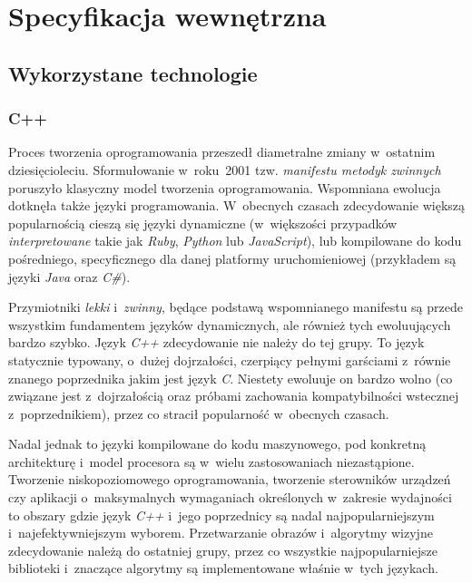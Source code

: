 \chapter{Specyfikacja wewnętrzna}\label{Chapter_SpecyfikacjaWewnetrzna}

  \section{Wykorzystane technologie}\label{Section_Technologie}

    \subsection{C++}\label{Subsection_Cpp}
      Proces tworzenia oprogramowania przeszedł diametralne zmiany w~ostatnim dziesięcioleciu. Sformułowanie w~roku~2001 tzw. \textit{manifestu metodyk zwinnych} poruszyło klasyczny model tworzenia oprogramowania. Wspomniana ewolucja dotknęła także języki programowania. W~obecnych czasach zdecydowanie większą popularnością cieszą się języki dynamiczne (w~większości przypadków \textit{interpretowane} takie jak \textit{Ruby}, \textit{Python} lub \textit{JavaScript}), lub kompilowane do kodu pośredniego, specyficznego dla danej platformy uruchomieniowej (przykładem są języki \textit{Java} oraz \textit{C\#}).

      Przymiotniki \textit{lekki} i~\textit{zwinny}, będące podstawą wspomnianego manifestu są przede wszystkim fundamentem języków dynamicznych, ale również tych ewoluujących bardzo szybko. Język \textit{C++} zdecydowanie nie należy do tej grupy. To język statycznie typowany, o~dużej dojrzałości, czerpiący pełnymi garściami z~równie znanego poprzednika jakim jest język \textit{C}. Niestety ewoluuje on bardzo wolno (co związane jest z~dojrzałością oraz próbami zachowania kompatybilności wstecznej z~poprzednikiem), przez co stracił popularność w~obecnych czasach.

      Nadal jednak to języki kompilowane do kodu maszynowego, pod konkretną architekturę i~model procesora są w~wielu zastosowaniach niezastąpione. Tworzenie niskopoziomowego oprogramowania, tworzenie sterowników urządzeń czy aplikacji o~maksymalnych wymaganiach określonych w~zakresie wydajności to obszary gdzie język \textit{C++} i~jego poprzednicy są nadal najpopularniejszym i~najefektywniejszym wyborem. Przetwarzanie obrazów i~algorytmy wizyjne zdecydowanie należą do ostatniej grupy, przez co wszystkie najpopularniejsze biblioteki i~znaczące algorytmy są implementowane właśnie w~tych językach.

